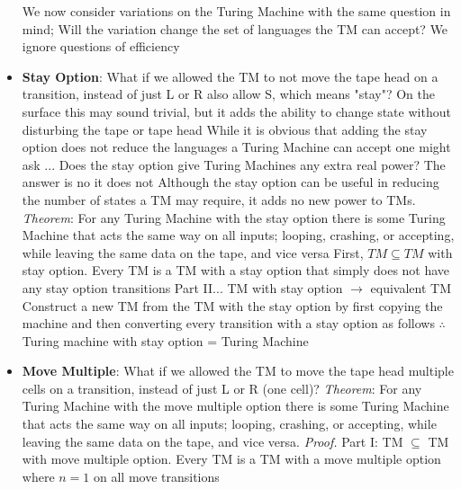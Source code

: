 \documentclass{report}
\begin{document}
\begin{itemize}
            \bigbreak \noindent 
            We now consider variations on the Turing Machine with the same question in mind; Will the variation change the set of languages the TM can accept?
            \bigbreak \noindent 
            We ignore questions of efficiency
        \item \textbf{Stay Option}: What if we allowed the TM to not move the tape head on a transition, instead of just L or R also allow S, which means "stay"?
            \bigbreak \noindent 
            On the surface this may sound trivial, but it adds the ability to change state without disturbing the tape or tape head
            \bigbreak \noindent 
            While it is obvious that adding the stay option does not reduce the languages a Turing Machine can accept one might ask ... Does the stay option give Turing Machines any extra real power? The answer is no it does not
            \bigbreak \noindent 
            Although the stay option can be useful in reducing the number of states a TM may require, it adds no new power to TMs.
            \bigbreak \noindent 
            \textit{Theorem}: For any Turing Machine with the stay option there is some Turing Machine that acts the same way on all inputs; looping, crashing, or accepting, while leaving the same data on the tape, and vice versa
            \bigbreak \noindent 
            First, $TM \subseteq TM$ with stay option. Every TM is a TM with a stay option that simply does not have any stay option transitions
            \bigbreak \noindent 
            Part II... TM with stay option $\to$ equivalent TM
            \bigbreak \noindent 
            Construct a new TM from the TM with the stay option by first copying the machine and then converting every transition with a stay option as follows
            \bigbreak \noindent 
            \bigbreak \noindent 
            $\therefore$ Turing machine with stay option = Turing Machine
        \item \textbf{Move Multiple}: What if we allowed the TM to move the tape head multiple cells on a transition, instead of just L or R (one cell)?
            \bigbreak \noindent 
            \textit{Theorem}: For any Turing Machine with the move multiple option there is some Turing Machine that acts the same way on all inputs; looping, crashing, or accepting, while leaving the same data on the tape, and vice versa.
            \bigbreak \noindent 
            \textit{Proof.} Part I: TM $\subseteq$ TM with move multiple option. Every TM is a TM with a move multiple option where $n=1$ on all move transitions

\end{itemize}
\end{document}
